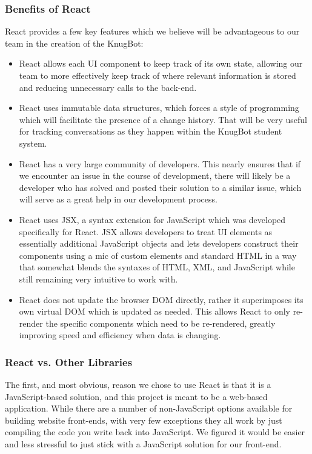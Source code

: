 \documentclass[titlepage, 12pt]{article}
\begin{document}
\subsubsection{Benefits of React}

React provides a few key features which we believe will be advantageous to our team in the creation of the KnugBot:

\begin{itemize}
    \item React allows each UI component to keep track of its own state, allowing our team to more effectively keep track of where relevant information is stored and reducing unnecessary calls to the back-end.
    \item React uses immutable data structures, which forces a style of programming which will facilitate the presence of a change history. That will be very useful for tracking conversations as they happen within the KnugBot student system.
    \item React has a very large community of developers. This nearly ensures that if we encounter an issue in the course of development, there will likely be a developer who has solved and posted their solution to a similar issue, which will serve as a great help in our development process.
    \item React uses JSX, a syntax extension for JavaScript which was developed specifically for React. JSX allows developers to treat UI elements as essentially additional JavaScript objects and lets developers construct their components using a mic of custom elements and standard HTML in a way that somewhat blends the syntaxes of HTML, XML, and JavaScript while still remaining very intuitive to work with.
    \item React does not update the browser DOM directly, rather it superimposes its own virtual DOM which is updated as needed. This allows React to only re-render the specific components which need to be re-rendered, greatly improving speed and efficiency when data is changing.
\end{itemize}

\subsubsection{React vs. Other Libraries}

The first, and most obvious, reason we chose to use React is that it is a JavaScript-based solution, and this project is meant to be a web-based application. While there are a number of non-JavaScript options available for building website front-ends, with very few exceptions they all work by just compiling the code you write back into JavaScript. We figured it would be easier and less stressful to just stick with a JavaScript solution for our front-end.
\end{document}
